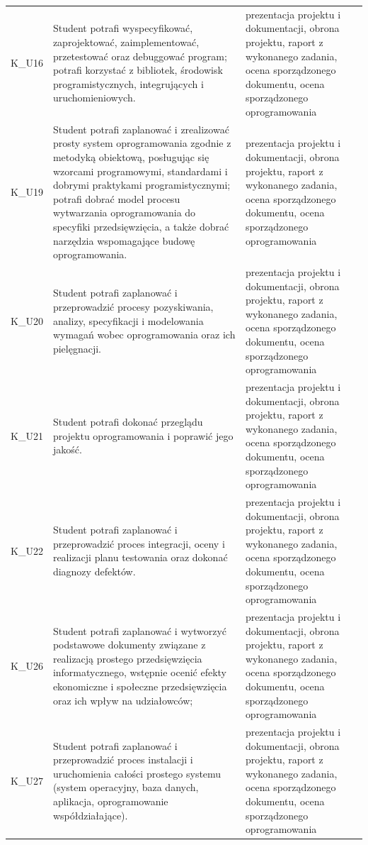 \documentclass[12pt, a4paper]{article}
\begin{document}
{\begin{longtable}{m{1.6cm}m{9.0cm}m{4.2cm}}
  \rowcolor{tableRowLight} K\_U16 & Student potrafi wyspecyfikować,  zaprojektować, zaimplementować, przetestować oraz debuggować program; potrafi korzystać z bibliotek, środowisk programistycznych, integrujących i uruchomieniowych. & prezentacja projektu i dokumentacji, obrona projektu, raport z wykonanego zadania, ocena sporządzonego dokumentu, ocena sporządzonego oprogramowania \\
  \rowcolor{tableRowAlt} K\_U19 & Student potrafi zaplanować i zrealizować prosty system oprogramowania zgodnie z metodyką obiektową, posługując się wzorcami programowymi, standardami i dobrymi praktykami programistycznymi; potrafi dobrać model procesu wytwarzania oprogramowania do specyfiki przedsięwzięcia, a także dobrać narzędzia wspomagające budowę oprogramowania. & prezentacja projektu i dokumentacji, obrona projektu, raport z wykonanego zadania, ocena sporządzonego dokumentu, ocena sporządzonego oprogramowania \\
  \rowcolor{tableRowLight} K\_U20 & Student potrafi zaplanować i przeprowadzić procesy pozyskiwania, analizy, specyfikacji i modelowania wymagań wobec oprogramowania oraz ich pielęgnacji. & prezentacja projektu i dokumentacji, obrona projektu, raport z wykonanego zadania, ocena sporządzonego dokumentu, ocena sporządzonego oprogramowania \\
  \rowcolor{tableRowAlt} K\_U21 & Student potrafi dokonać przeglądu projektu oprogramowania i poprawić jego jakość. & prezentacja projektu i dokumentacji, obrona projektu, raport z wykonanego zadania, ocena sporządzonego dokumentu, ocena sporządzonego oprogramowania \\
  \rowcolor{tableRowLight} K\_U22 & Student potrafi zaplanować i przeprowadzić proces integracji, oceny i realizacji planu testowania oraz dokonać diagnozy defektów. & prezentacja projektu i dokumentacji, obrona projektu, raport z wykonanego zadania, ocena sporządzonego dokumentu, ocena sporządzonego oprogramowania \\
  \rowcolor{tableRowAlt} K\_U26 & Student potrafi zaplanować i wytworzyć podstawowe dokumenty związane z realizacją prostego przedsięwzięcia informatycznego, wstępnie ocenić efekty ekonomiczne i społeczne przedsięwzięcia oraz ich wpływ na udziałowców; & prezentacja projektu i dokumentacji, obrona projektu, raport z wykonanego zadania, ocena sporządzonego dokumentu, ocena sporządzonego oprogramowania \\
  \rowcolor{tableRowLight} K\_U27 & Student potrafi zaplanować i przeprowadzić  proces instalacji i uruchomienia całości prostego systemu (system operacyjny, baza danych, aplikacja, oprogramowanie współdziałające). & prezentacja projektu i dokumentacji, obrona projektu, raport z wykonanego zadania, ocena sporządzonego dokumentu, ocena sporządzonego oprogramowania \\
\bottomrule
\end{longtable}}
\end{document}
